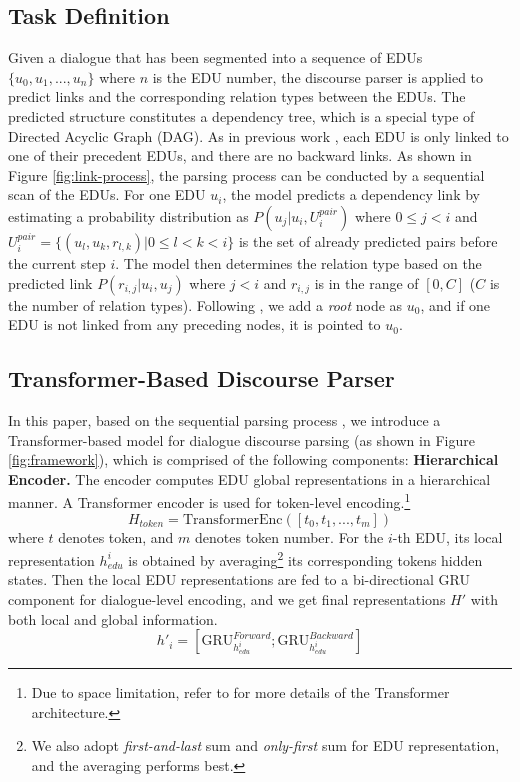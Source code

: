 \documentclass[11pt]{article}
\begin{document}
\subsection{Task Definition}
Given a dialogue that has been segmented into a sequence of EDUs $\{u_0, u_1,..., u_n\}$ where $n$ is the EDU number, the discourse parser is applied to predict links and the corresponding relation types between the EDUs. The predicted structure constitutes a dependency tree, which is a special type of Directed Acyclic Graph (DAG). 
As in previous work \cite{shi2019deepSeqParser}, each EDU is only linked to one of their precedent EDUs, and there are no backward links.
As shown in Figure \ref{fig:link-process}, the parsing process can be conducted by a sequential scan of the EDUs.
For one EDU $u_i$, the model predicts a dependency link by estimating a probability distribution as $P(u_j|u_i, U^{pair}_i)$ where $0\leq j<i$ and $U^{pair}_i=\{(u_l,u_k,r_{l,k})|0\leq l<k<i\}$ is the set of already predicted pairs before the current step $i$. The model then determines the relation type based on the predicted link $P(r_{i,j}|u_i, u_j)$ where $j < i$ and $r_{i,j}$ is in the range of $[0,C]$ ($C$ is the number of relation types). Following \citet{li2014textParsing}, we add a \textit{root} node as $u_0$, and if one EDU is not linked from any preceding nodes, it is pointed to $u_0$.

\subsection{Transformer-Based Discourse Parser}
In this paper, based on the sequential parsing process \cite{shi2019deepSeqParser}, we introduce a Transformer-based model for dialogue discourse parsing (as shown in Figure \ref{fig:framework}), which is comprised of the following components:
\newline\noindent \textbf{Hierarchical Encoder.} The encoder computes EDU global representations in a hierarchical manner. A Transformer encoder \cite{vaswani-2017-Transformer} is used for token-level encoding.\footnote{Due to space limitation, refer to \cite{vaswani-2017-Transformer} for more details of the Transformer architecture.}
\begin{equation} H_{token}=\mathrm{TransformerEnc}([t_0, t_1,..., t_m])
\end{equation}
where $t$ denotes token, and $m$ denotes token number. For the $i$-th EDU, its local representation $h^i_{edu}$ is obtained by averaging\footnote{We also adopt \textit{first-and-last} sum and \textit{only-first} sum for EDU representation, and the averaging performs best.} its corresponding tokens hidden states. Then the local EDU representations are fed to a bi-directional GRU component \cite{chung2014GRU} for dialogue-level encoding, and we get final representations $H'$ with both local and global information.
\begin{equation} h'_{i}=[\mathrm{GRU}^{Forward}_{h^i_{edu}};\mathrm{GRU}^{Backward}_{h^i_{edu}}]
\end{equation}
\end{document}
